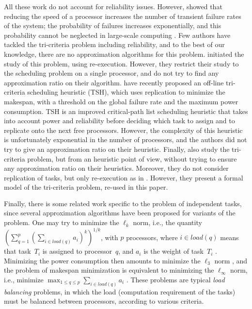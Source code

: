 \documentclass[a4paper]{article}
\theoremstyle{plain}
\theoremstyle{definition}
\theoremstyle{remark}
\begin{document}
All these work do not account for reliability issues. However,
\cite{Zhu04EEM} showed that reducing the speed of a processor
increases the number of transient failure rates of the system; the
probability of failures increases exponentially, and this probability
cannot be neglected in large-scale computing \cite{Oliner04}.  Few
authors have tackled the tri-criteria problem including reliability,
and to the best of our knowledge, there are no approximation
algorithms for this problem. \cite{Zhu06} initiated the study of this
problem, using re-execution. However, they restrict their study to the
scheduling problem on a single processor, and do not try to find any
approximation ratio on their algorithm. \cite{Assayad11} have
recently proposed an off-line tri-criteria scheduling heuristic (TSH),
which uses replication to minimize the makespan, with a
threshold on the global failure rate and the maximum power
consumption.  TSH is an improved critical-path list sche\-duling
heuristic that takes into account power and reliability before
deciding which task to assign and to replicate onto the next free
processors. However, the complexity of this heuristic is unfortunately
exponential in the number of processors, and the authors did not try
to give an approximation ratio on their heuristic.  Finally,
\cite{rr7757} also study the tri-criteria problem, but from an
heuristic point of view, without trying to ensure any approximation
ratio on their heuristics. Moreover, they do not consider replication
of tasks, but only re-execution as in \cite{Zhu06}.  However, they
present a formal model of the tri-criteria problem, re-used in this
paper.

Finally, there is some related work specific to the problem of
independent tasks, since several approximation algorithms have been
proposed for variants of the problem. One may try to minimize the
$\ell_k$ norm, i.e., the quantity $(\sum_{q=1}^p (\sum_{i\in load(q)}
a_i)^k)^{1/k}$, with $p$ processors, where $i\in load(q)$ means that
task~$T_i$ is assigned to processor~$q$, and $a_i$ is the weight of
task~$T_i$ \cite{Alon97}.  Minimizing the power consumption
then amounts to minimize the $\ell_3$ norm
\cite{RenaudGoudGreedy}, and the problem of makespan minimization is
equivalent to minimizing  
the $\ell_{\infty}$ norm, i.e., minimize $\max_{1\leq q \leq p}
\sum_{i\in load(q)} a_i$ \cite{Graham69,Ausiello99}.  These problems
are typical {\em load balancing} problems, in which the load
(computation requirement of the tasks) must be balanced between
processors, according to various criteria.
\end{document}

